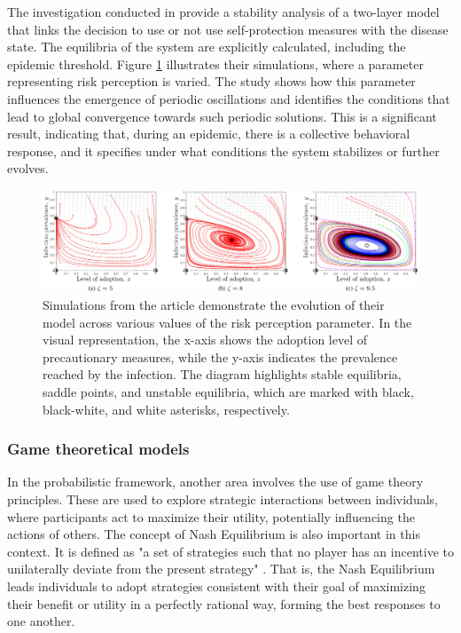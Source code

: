The investigation conducted in \cite{Frieswijk_2022} provide a stability analysis of a two-layer model that links the decision to use or not use self-protection measures with the disease state. The equilibria of the system are explicitly calculated, including the epidemic threshold. Figure \ref{fig:stability_friesjiw} illustrates their simulations, where a parameter representing risk perception is varied. The study shows how this parameter influences the emergence of periodic oscillations and identifies the conditions that lead to global convergence towards such periodic solutions. This is a significant result, indicating that, during an epidemic, there is a collective behavioral response, and it specifies under what conditions the system stabilizes or further evolves.

\begin{figure}[]
	\centering
	\includegraphics[width=0.95\linewidth]{0_introduction/images_review/stable_unstable_equilibria_friejs}
	\caption[Stability analysis of epi-behavior model]{Simulations from the article \cite{Frieswijk_2022} demonstrate the evolution of their model across various values of the risk perception parameter. In the visual representation, the x-axis shows the adoption level of precautionary measures, while the y-axis indicates the prevalence reached by the infection. The diagram highlights stable equilibria, saddle points, and unstable equilibria, which are marked with black, black-white, and white asterisks, respectively.}
	\label{fig:stability_friesjiw}
\end{figure}

\subsubsection{Game theoretical models}
In the probabilistic framework, another area involves the use of game theory principles. These are used to explore strategic interactions between individuals, where participants act to maximize their utility, potentially influencing the actions of others. The concept of Nash Equilibrium is also important in this context. It is defined as "a set of strategies such that no player has an incentive to unilaterally deviate from the present strategy" \cite{Wang_2015_review}. That is, the Nash Equilibrium leads individuals to adopt strategies consistent with their goal of maximizing their benefit or utility in a perfectly rational way, forming the best responses to one another.

